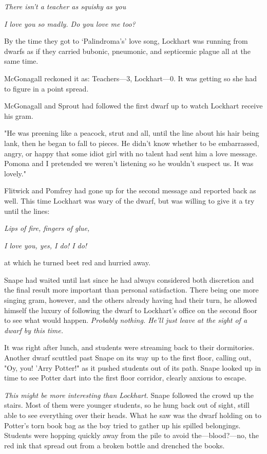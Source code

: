 \emph{There isn't a teacher as squishy as you}

\emph{I love you so madly. Do you love me too?}

By the time they got to `Palindroma's' love song, Lockhart was running from dwarfs as if they carried bubonic, pneumonic, and septicemic plague all at the same time.

McGonagall reckoned it as: Teachers—3, Lockhart—0. It was getting so she had to figure in a point spread.

McGonagall and Sprout had followed the first dwarf up to watch Lockhart receive his gram.

"He was preening like a peacock, strut and all, until the line about his hair being lank, then he began to fall to pieces. He didn't know whether to be embarrassed, angry, or happy that some idiot girl with no talent had sent him a love message. Pomona and I pretended we weren't listening so he wouldn't suspect us. It was lovely."

Flitwick and Pomfrey had gone up for the second message and reported back as well. This time Lockhart was wary of the dwarf, but was willing to give it a try until the lines:

\emph{Lips of fire, fingers of glue,}

\emph{I love you, yes, I do! I do!}

at which he turned beet red and hurried away.

Snape had waited until last since he had always considered both discretion and the final result more important than personal satisfaction. There being one more singing gram, however, and the others already having had their turn, he allowed himself the luxury of following the dwarf to Lockhart's office on the second floor to see what would happen. \emph{Probably nothing. He'll just leave at the sight of a dwarf by this time.}

It was right after lunch, and students were streaming back to their dormitories. Another dwarf scuttled past Snape on its way up to the first floor, calling out, "Oy, you! 'Arry Potter!" as it pushed students out of its path. Snape looked up in time to see Potter dart into the first floor corridor, clearly anxious to escape.

\emph{This might be more interesting than Lockhart.} Snape followed the crowd up the stairs. Most of them were younger students, so he hung back out of sight, still able to see everything over their heads. What he saw was the dwarf holding on to Potter's torn book bag as the boy tried to gather up his spilled belongings. Students were hopping quickly away from the pile to avoid the—blood?—no, the red ink that spread out from a broken bottle and drenched the books.

